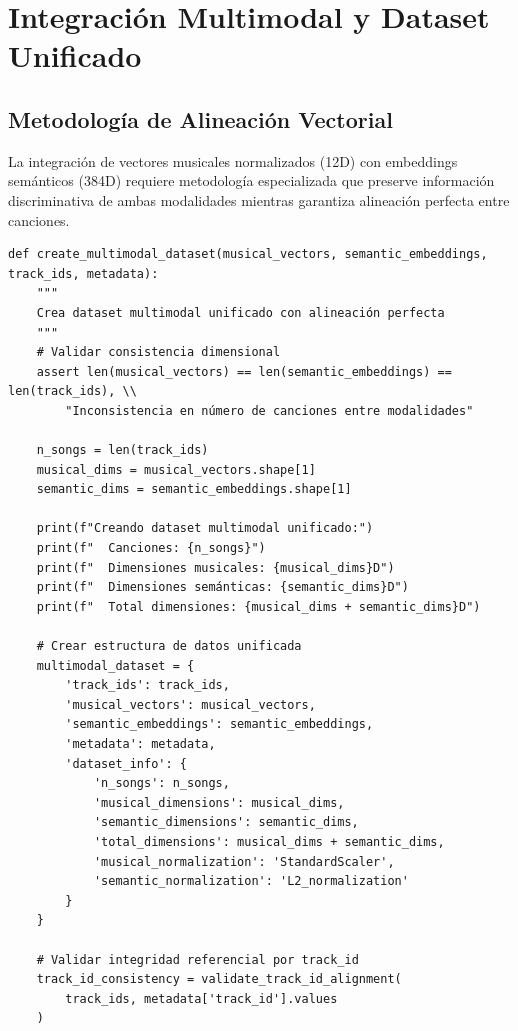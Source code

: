 \documentclass[12pt,a4paper]{report}
\begin{document}
\section{Integración Multimodal y Dataset Unificado}

\subsection{Metodología de Alineación Vectorial}

La integración de vectores musicales normalizados (12D) con embeddings semánticos (384D) requiere metodología especializada que preserve información discriminativa de ambas modalidades mientras garantiza alineación perfecta entre canciones.

\begin{lstlisting}[caption={Integración de Vectores Musicales y Semánticos}]
def create_multimodal_dataset(musical_vectors, semantic_embeddings, track_ids, metadata):
    """
    Crea dataset multimodal unificado con alineación perfecta
    """
    # Validar consistencia dimensional
    assert len(musical_vectors) == len(semantic_embeddings) == len(track_ids), \\
        "Inconsistencia en número de canciones entre modalidades"

    n_songs = len(track_ids)
    musical_dims = musical_vectors.shape[1]
    semantic_dims = semantic_embeddings.shape[1]

    print(f"Creando dataset multimodal unificado:")
    print(f"  Canciones: {n_songs}")
    print(f"  Dimensiones musicales: {musical_dims}D")
    print(f"  Dimensiones semánticas: {semantic_dims}D")
    print(f"  Total dimensiones: {musical_dims + semantic_dims}D")

    # Crear estructura de datos unificada
    multimodal_dataset = {
        'track_ids': track_ids,
        'musical_vectors': musical_vectors,
        'semantic_embeddings': semantic_embeddings,
        'metadata': metadata,
        'dataset_info': {
            'n_songs': n_songs,
            'musical_dimensions': musical_dims,
            'semantic_dimensions': semantic_dims,
            'total_dimensions': musical_dims + semantic_dims,
            'musical_normalization': 'StandardScaler',
            'semantic_normalization': 'L2_normalization'
        }
    }

    # Validar integridad referencial por track_id
    track_id_consistency = validate_track_id_alignment(
        track_ids, metadata['track_id'].values
    )


\end{lstlisting}
\end{document}
